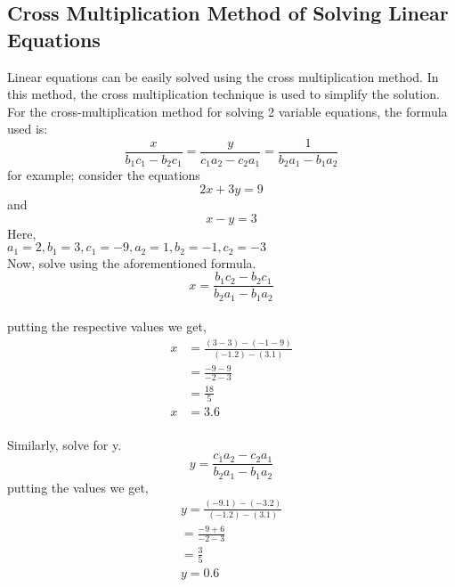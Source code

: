 \documentclass[a4paper, 12pt]{report}
\begin{document}
{         \subsection{Cross Multiplication Method of Solving Linear Equations}
          Linear equations can be easily solved using the cross multiplication method. In this method, the cross multiplication technique is used to simplify the solution. For the cross-multiplication method for solving 2 variable equations, the formula used is:\\
          \begin{equation}
          \frac{x}{b_1 c_1 - b_2 c_1} = \frac{y}{ c_1 a_2 - c_2 a_1 } = \frac{1}{ b_2 a_1 - b_1 a_2 }
          \end{equation}
          for example; consider the equations
          \begin{equation}
          2x + 3y = 9
          \end{equation}
          and
          \begin{equation}
          x - y = 3
          \end{equation}
      Here,\\
      $a_1 = 2, b_1 = 3, c_1 = -9, a_2 = 1, b_2 = -1, c_2 = -3$\\
      Now, solve using the aforementioned formula.\\
      \begin{equation}
      x = \frac { b_1 c_2 - b_2 c_1 } { b_2 a_1 - b_1 a_2 }
      \end{equation}\\
      putting the respective values we get,
      \begin{align*}
      x &= \frac{ (3 -3) - (-1 -9) } { (-1 . 2) - (3 . 1) }\\
      &= \frac{-9 - 9} {-2 - 3}\\
      &= \frac{18}{5}\\
      x &= 3.6
      \end{align*}\\
      Similarly, solve for y.
      \begin{equation}
      y = \frac{ c_1 a_2 - c_2 a_1 }{ b_2 a_1 - b_1 a_2 }
      \end{equation}
      putting the values we get,
      \begin{align*}
      y = \frac{ (-9 . 1) - (-3 . 2) }{ (-1 . 2) - (3 . 1) }\\
      = \frac{-9 + 6 }{-2 - 3}\\
      = \frac {3}{5}\\
      y = 0.6
      \end{align*}\\
      
}
\end{document}
